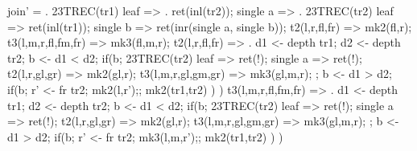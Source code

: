 join' = .
  23TREC(tr1){
    leaf => . ret(inl(tr2));
    single a => .
      23TREC(tr2){
        leaf => ret(inl(tr1));
        single b => ret(inr(single a, single b));
        t2(l,r,fl,fr) => mk2(fl,r);
        t3(l,m,r,fl,fm,fr) => mk3(fl,m,r);
      }
    t2(l,r,fl,fr) => .
      d1 <- depth tr1;
      d2 <- depth tr2;
      b <- d1 < d2;
      if(b;
        23TREC(tr2){
         leaf => ret(!);
         single a => ret(!);
         t2(l,r,gl,gr) => mk2(gl,r);
         t3(l,m,r,gl,gm,gr) => mk3(gl,m,r);
        };
        b <- d1 > d2;
        if(b;
          r' <- fr tr2;
          mk2(l,r');;
          mk2(tr1,tr2)
        )
      )
    t3(l,m,r,fl,fm,fr) => .
      d1 <- depth tr1;
      d2 <- depth tr2;
      b <- d1 < d2;
      if(b;
        23TREC(tr2){
         leaf => ret(!);
         single a => ret(!);
         t2(l,r,gl,gr) => mk2(gl,r);
         t3(l,m,r,gl,gm,gr) => mk3(gl,m,r);
        };
        b <- d1 > d2;
        if(b;
          r' <- fr tr2;
          mk3(l,m,r');;
          mk2(tr1,tr2)
        )
      )
  }
\fi

\iffalse
  \left
  \mathsf{full\_left} \triangleq 
    \lam{t}{\_}{
      \lam{n}{\_}{
      \ttrec{t}{\const{\zero}}{\_}{\const{\zero}}
        {\_,\_,s_l,d_l,\_,\_,f_l,\_}\\{
          \bind{d_l+1}{d}{\bind{\eq\;n\;d}{b}{\ifnat{b}{\ret{b}}{\ret{f_l}}}}}\\
        {\_,\_,\_,s_l,d_l,\_,\_,\_,\_,f_l,\_,\_}{
          \bind{d_l+1}{d}{\bind{\eq\;n\;d}{b}{\ifnat{b}{\ret{\zero}}{\ret{f_l}}}}}
        }
        }\\
  \mathsf{full\_right} \triangleq 
    \lam{t}{}{
      \ttrec{t}{\const{\zero}}{\_}{\const{\zero}}
        {\_}{\lam{n}{\_}{\eq\;n\;d}}
          {\_,\_,f_l,f_r}{\bind{n-1}{n'}{f_r\; n'}}
        }\\
\join \triangleq 
  \lam{t_1}{\tttree{s_1}{d_1}}{
    \lam{t_2}{\tttree{s_2}{d_2}}{
    }}
\fi
